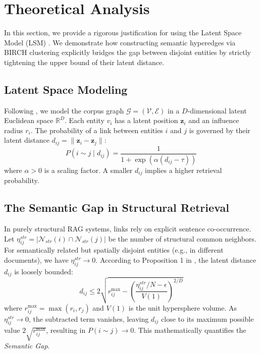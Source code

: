 

\section{Theoretical Analysis}
\label{sec:theory}

In this section, we provide a rigorous justification for \EHGRAG using the Latent Space Model (LSM) \cite{mao2024revisiting}. We demonstrate how constructing semantic hyperedges via BIRCH clustering explicitly bridges the gap between disjoint entities by strictly tightening the upper bound of their latent distance.

\subsection{Latent Space Modeling}
Following \cite{mao2024revisiting,sarkar2011theoretical}, we model the corpus graph $\mathcal{G}=(\mathcal{V}, \mathcal{E})$ in a $D$-dimensional latent Euclidean space $\mathbb{R}^D$. Each entity $v_i$ has a latent position $\mathbf{z}_i$ and an influence radius $r_i$. The probability of a link between entities $i$ and $j$ is governed by their latent distance $d_{ij} = \|\mathbf{z}_i - \mathbf{z}_j\|$:
\begin{equation}
    P(i \sim j \mid d_{ij}) = \frac{1}{1 + \exp(\alpha(d_{ij} - \tau))}
\end{equation}
where $\alpha > 0$ is a scaling factor. A smaller $d_{ij}$ implies a higher retrieval probability.

\subsection{The Semantic Gap in Structural Retrieval}
In purely structural RAG systems, links rely on explicit sentence co-occurrence. Let $\eta_{ij}^{str} = |\mathcal{N}_{str}(i) \cap \mathcal{N}_{str}(j)|$ be the number of structural common neighbors.
For semantically related but spatially disjoint entities (e.g., in different documents), we have $\eta_{ij}^{str} \to 0$. According to Proposition 1 in \cite{mao2024revisiting}, the latent distance $d_{ij}$ is loosely bounded:
\begin{equation}
    d_{ij} \le 2\sqrt{r_{ij}^{\max} - \left(\frac{\eta_{ij}^{str}/N - \epsilon}{V(1)}\right)^{2/D}}
\end{equation}
where $r_{ij}^{\max} = \max(r_i, r_j)$ and $V(1)$ is the unit hypersphere volume. As $\eta_{ij}^{str} \to 0$, the subtracted term vanishes, leaving $d_{ij}$ close to its maximum possible value $2\sqrt{r_{ij}^{\max}}$, resulting in $P(i \sim j) \to 0$. This mathematically quantifies the \textit{Semantic Gap}.

